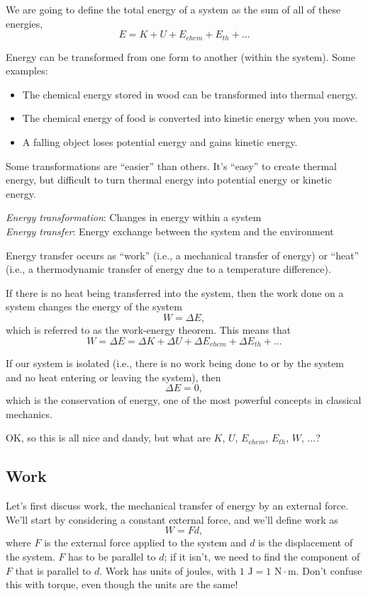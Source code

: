 We are going to define the total energy of a system as the sum of all of these energies,
$$E=K+U+E_{chem}+E_{th}+...$$

Energy can be transformed from one form to another (within the system). Some examples:
\begin{itemize}
\item The chemical energy stored in wood can be transformed into thermal energy.
\item The chemical energy of food is converted into kinetic energy when you move.
\item A falling object loses potential energy and gains kinetic energy.
\end{itemize}

Some transformations are ``easier'' than others. It's ``easy'' to create thermal energy, but difficult to turn thermal energy into potential energy or kinetic energy.

\textit{Energy transformation}: Changes in energy within a system\\
\textit{Energy transfer}: Energy exchange between the system and the environment

Energy transfer occurs as ``work'' (i.e., a mechanical transfer of energy) or ``heat'' (i.e., a thermodynamic transfer of energy due to a temperature difference).

If there is no heat being transferred into the system, then the work done on a system changes the energy of the system
$$W=\Delta E,$$
which is referred to as the work-energy theorem. This means that
$$W=\Delta{E}=\Delta{K}+\Delta{U}+\Delta{E_{chem}}+\Delta{E_{th}}+\ldots$$


If our system is isolated (i.e., there is no work being done to or by the system and no heat entering or leaving the system), then 
$$\Delta{E}=0,$$
which is the conservation of energy, one of the most powerful concepts in classical mechanics.

OK, so this is all nice and dandy, but what are $K$, $U$, $E_{chem}$, $E_{th}$, $W$, $...$?

\subsection{Work}
Let's first discuss work, the mechanical transfer of energy by an external force. We'll start by considering a constant external force, and we'll define work as 
$$W=Fd,$$
where $F$ is the external force applied to the system and $d$ is the displacement of the system. $F$ has to be parallel to $d$; if it isn't, we need to find the component of $F$ that is parallel to $d$. Work has units of joules, with $1\mbox{ J}=1\mbox{ N}\cdot\mbox{m}$. Don't confuse this with torque, even though the units are the same!

